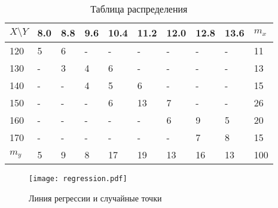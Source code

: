 \documentclass{article}
\theoremstyle{problemstyle}
\begin{document}
\begin{table}[H]
	\centering
	\begin{tabular}{|l|l|l|l|l|l|l|l|l|l|}
		\hline
		$X \setminus Y$ & 8.0 & 8.8 & 9.6 & 10.4 & 11.2 & 12.0 & 12.8 & 13.6 & $m_x$ \\
		\hline
		120             & 5   & 6   & -   & -    & -    & -    & -    & -    & 11    \\
		130             & -   & 3   & 4   & 6    & -    & -    & -    & -    & 13    \\
		140             & -   & -   & 4   & 5    & 6    & -    & -    & -    & 15    \\
		150             & -   & -   & -   & 6    & 13   & 7    & -    & -    & 26    \\
		160             & -   & -   & -   & -    & -    & 6    & 9    & 5    & 20    \\
		170             & -   & -   & -   & -    & -    & -    & 7    & 8    & 15    \\
		\hline
		$m_y$           & 5   & 9   & 8   & 17   & 19   & 13   & 16   & 13   & 100   \\
		\hline
	\end{tabular}
	\caption{Таблица распределения}\label{tab:2_data}
\end{table}

\begin{figure}[H]
	\centering
	\texttt{[image: regression.pdf]}
	\caption{Линия регрессии и случайные точки}\label{fig:regression}
\end{figure}
\end{document}
